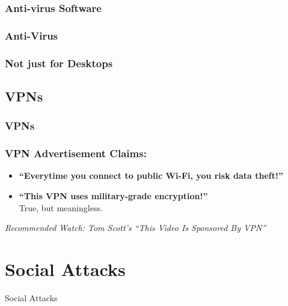 \documentclass[aspectratio=169,dvipsnames]{beamer}
\begin{document}
\subsubsection{Anti-virus Software}

\begin{frame}
\frametitle{Anti-Virus}
\end{frame}

\begin{frame}
\frametitle{Not just for Desktops}
\end{frame}

\subsection{VPNs}

\begin{frame}
\frametitle{VPNs}
\end{frame}

\begin{frame}
\frametitle{VPN Advertisement Claims:}

\begin{itemize}
\item \textbf{``Everytime you connect to public Wi-Fi, you risk data theft!''}
\pause \item \textbf{``This VPN uses military-grade encryption!''}\\
True, but meaningless.
\end{itemize}


\pause
\begin{center}
\emph{Recommended Watch: Tom Scott's ``This Video Is Sponsored By VPN''}
\end{center}
\end{frame}


\section{Social Attacks}
\begin{frame}
\begin{center}
\huge Social Attacks
\end{center}
\end{frame}
\end{document}
